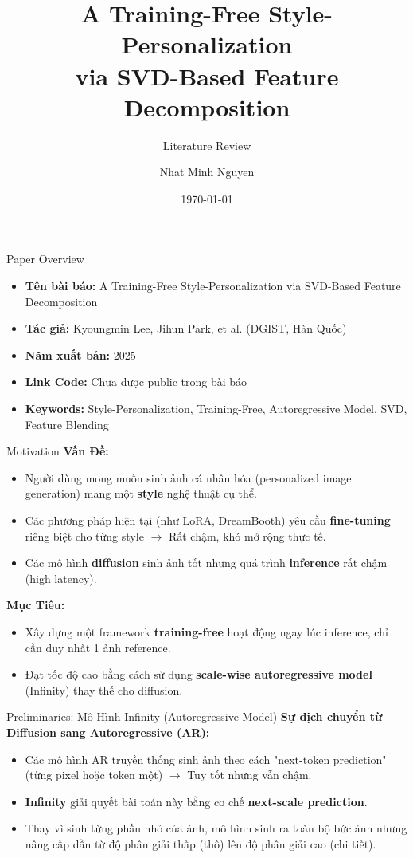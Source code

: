 \documentclass[aspectratio=169, 10pt]{beamer}
\title[Training-Free Style-Personalization]{A Training-Free Style-Personalization \\ via SVD-Based Feature Decomposition}
\subtitle{Literature Review}
\author{Nhat Minh Nguyen}
\institute{Pixelchemy Generative Group}
\date{\today}
\begin{document}
	
	\begin{frame}
		\titlepage
	\end{frame}
	
	\begin{frame}{Paper Overview}
		\begin{itemize}
			\item \textbf{Tên bài báo:} A Training-Free Style-Personalization via SVD-Based Feature Decomposition
			\item \textbf{Tác giả:} Kyoungmin Lee, Jihun Park, et al. (DGIST, Hàn Quốc)	
			\item \textbf{Năm xuất bản:} 2025
			\item \textbf{Link Code:} Chưa được public trong bài báo
			\item \textbf{Keywords:} Style-Personalization, Training-Free, Autoregressive Model, SVD, Feature Blending
		\end{itemize}
	\end{frame}
	
	\begin{frame}{Motivation}
		\textbf{Vấn Đề:}
		\begin{itemize}
			\item Người dùng mong muốn sinh ảnh cá nhân hóa (personalized image generation) mang một \textbf{style} nghệ thuật cụ thể.
			\item Các phương pháp hiện tại (như LoRA, DreamBooth) yêu cầu \textbf{fine-tuning} riêng biệt cho từng style $\rightarrow$ Rất chậm, khó mở rộng thực tế.
			\item Các mô hình \textbf{diffusion} sinh ảnh tốt nhưng quá trình \textbf{inference} rất chậm (high latency).
		\end{itemize}
		\vspace{0.5cm}
		\textbf{Mục Tiêu:}
		\begin{itemize}
			\item Xây dựng một framework \textbf{training-free} hoạt động ngay lúc inference, chỉ cần duy nhất 1 ảnh reference.
			\item Đạt tốc độ cao bằng cách sử dụng \textbf{scale-wise autoregressive model} (Infinity) thay thế cho diffusion.
		\end{itemize}
	\end{frame}
\begin{frame}{Preliminaries: Mô Hình Infinity (Autoregressive Model)}
		\textbf{Sự dịch chuyển từ Diffusion sang Autoregressive (AR):}
		\begin{itemize}
			\item Các mô hình AR truyền thống sinh ảnh theo cách "next-token prediction" (từng pixel hoặc token một) $\rightarrow$ Tuy tốt nhưng vẫn chậm.
			\item \textbf{Infinity} giải quyết bài toán này bằng cơ chế \textbf{next-scale prediction}. 
			\item Thay vì sinh từng phần nhỏ của ảnh, mô hình sinh ra toàn bộ bức ảnh nhưng nâng cấp dần từ độ phân giải thấp (thô) lên độ phân giải cao (chi tiết).
		\end{itemize}
	\end{frame}
	
\end{document}
